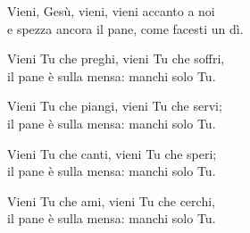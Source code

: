 
\strofa Vieni, Gesù, vieni, vieni accanto a noi\\
e spezza ancora il pane, come facesti un dì.

\spazio

\strofa Vieni Tu che preghi, vieni Tu che soffri,\\
il pane è sulla mensa: manchi solo Tu.

\spazio

\strofa Vieni Tu che piangi, vieni Tu che servi;\\
il pane è sulla mensa: manchi solo Tu.

\spazio

\strofa Vieni Tu che canti, vieni Tu che speri;\\
il pane è sulla mensa: manchi solo Tu.

\spazio

\strofa Vieni Tu che ami, vieni Tu che cerchi,\\
il pane è sulla mensa: manchi solo Tu.
